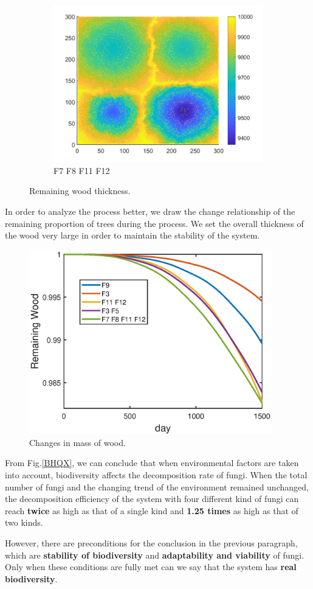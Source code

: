 \documentclass{mcmthesis}
\begin{document}
\begin{figure}[H]
\begin{subfigure}{0.3\textwidth}
		\includegraphics[width=\textwidth]{./T5Figure/K4N1/K4N1L.pdf}
		\caption{F7 F8 F11 F12}
	\end{subfigure}
	\caption{Remaining wood thickness.}
	\label{SYHD}
\end{figure}
\par In order to analyze the process better, we draw the change relationship of the remaining proportion of trees during the process. We set the overall thickness of the wood very large in order to maintain the stability of the system.

\begin{figure}[H] 
	\centering 
	\includegraphics[height=8cm]{./T5Figure/T5overAll.eps}
	\caption{Changes in mass of wood.}
	\label{BHQX}
\end{figure}
\par From Fig.\eqref{BHQX}, we can conclude that when environmental factors are taken into account, biodiversity affects the decomposition rate of fungi. When the total number of fungi and the changing trend of the environment remained unchanged, the decomposition efficiency of the system with four different kind of fungi can reach \textbf{twice} as high as that of a single kind and \textbf{1.25 times} as high as that of two kinds.
\par However, there are preconditions for the conclusion in the previous paragraph, which are \textbf{stability of biodiversity} and \textbf{adaptability and viability} of fungi. Only when these conditions are fully met can we say that the system has \textbf{real biodiversity}.
\end{document}
